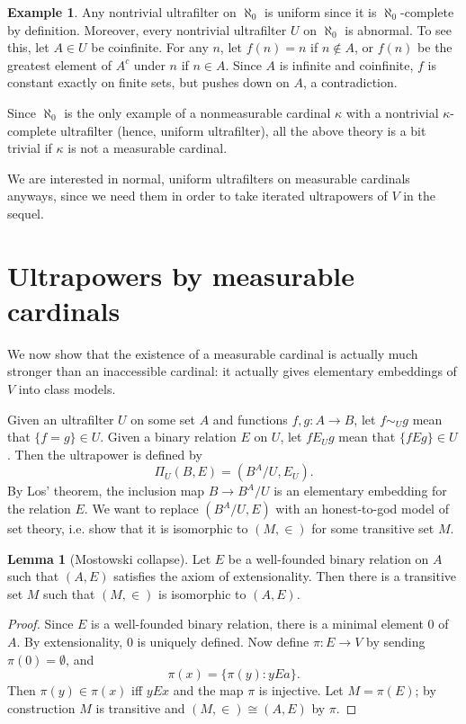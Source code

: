 \documentclass[12pt]{report}
\theoremstyle{definition}
\newtheorem{lemma}[theorem]{Lemma}
\newtheorem{example}[theorem]{Example}
\begin{document}
\begin{example}
Any nontrivial ultrafilter on $\aleph_0$ is uniform since it is $\aleph_0$-complete by definition. Moreover, every nontrivial ultrafilter $U$ on $\aleph_0$ is abnormal. To see this, let $A \in U$ be coinfinite. For any $n$, let $f(n) = n$ if $n \notin A$, or $f(n)$ be the greatest element of $A^c$ under $n$ if $n \in A$. Since $A$ is infinite and coinfinite, $f$ is constant exactly on finite sets, but pushes down on $A$, a contradiction.

Since $\aleph_0$ is the only example of a nonmeasurable cardinal $\kappa$ with a nontrivial $\kappa$-complete ultrafilter (hence, uniform ultrafilter), all the above theory is a bit trivial if $\kappa$ is not a measurable cardinal.
\end{example}

We are interested in normal, uniform ultrafilters on measurable cardinals anyways, since we need them in order to take iterated ultrapowers of $V$ in the sequel.

\section{Ultrapowers by measurable cardinals}
We now show that the existence of a measurable cardinal is actually much stronger than an inaccessible cardinal: it actually gives elementary embeddings of $V$ into class models.

Given an ultrafilter $U$ on some set $A$ and functions $f,g: A \to B$, let $f \sim_U g$ mean that $\{f = g\} \in U$. Given a binary relation $E$ on $U$, let $f E_U g$ mean that $\{fEg\} \in U$. Then the ultrapower is defined by
$$\Pi_U(B, E) = (B^A/U, E_U).$$
By Los' theorem, the inclusion map $B \to B^A/U$ is an elementary embedding for the relation $E$.
We want to replace $(B^A/U, E)$ with an honest-to-god model of set theory, i.e. show that it is isomorphic to $(M, \in)$ for some transitive set $M$.

\begin{lemma}[Mostowski collapse]
Let $E$ be a well-founded binary relation on $A$ such that $(A, E)$ satisfies the axiom of extensionality. Then there is a transitive set $M$ such that $(M, \in)$ is isomorphic to $(A, E)$.
\end{lemma}
\begin{proof}
Since $E$ is a well-founded binary relation, there is a minimal element $0$ of $A$. By extensionality, $0$ is uniquely defined. Now define $\pi: E \to V$ by sending $\pi(0) = \emptyset$, and
$$\pi(x) = \{\pi(y): yEa\}.$$
Then $\pi(y) \in \pi(x)$ iff $y E x$ and the map $\pi$ is injective. Let $M = \pi(E)$; by construction $M$ is transitive and $(M, \in) \cong (A, E)$ by $\pi$.
\end{proof}
\end{document}
